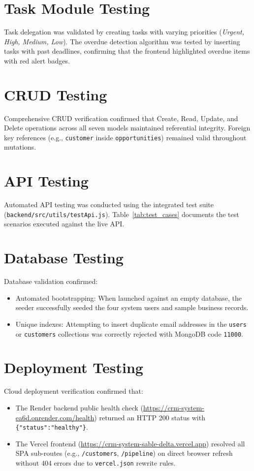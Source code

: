 \section{Task Module Testing}
Task delegation was validated by creating tasks with varying priorities (\textit{Urgent, High, Medium, Low}). The overdue detection algorithm was tested by inserting tasks with past deadlines, confirming that the frontend highlighted overdue items with red alert badges.

\section{CRUD Testing}
Comprehensive CRUD verification confirmed that Create, Read, Update, and Delete operations across all seven models maintained referential integrity. Foreign key references (e.g., \texttt{customer} inside \texttt{opportunities}) remained valid throughout mutations.

\section{API Testing}
Automated API testing was conducted using the integrated test suite (\texttt{backend/src/utils/testApi.js}). Table~\ref{tab:test_cases} documents the test scenarios executed against the live API.

\section{Database Testing}
Database validation confirmed:
\begin{itemize}
    \item Automated bootstrapping: When launched against an empty database, the seeder successfully seeded the four system users and sample business records.
    \item Unique indexes: Attempting to insert duplicate email addresses in the \texttt{users} or \texttt{customers} collections was correctly rejected with MongoDB code \texttt{11000}.
\end{itemize}

\section{Deployment Testing}
Cloud deployment verification confirmed that:
\begin{itemize}
    \item The Render backend public health check (\url{https://crm-system-ea6d.onrender.com/health}) returned an HTTP 200 status with \texttt{\{"status":"healthy"\}}.
    \item The Vercel frontend (\url{https://crm-system-sable-delta.vercel.app}) resolved all SPA sub-routes (e.g., \texttt{/customers}, \texttt{/pipeline}) on direct browser refresh without 404 errors due to \texttt{vercel.json} rewrite rules.
\end{itemize}

